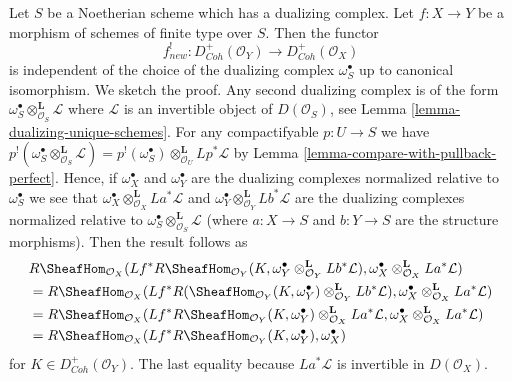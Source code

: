 \begin{remark}
\label{remark-independent-omega-S}
Let $S$ be a Noetherian scheme which has a dualizing complex.
Let $f : X \to Y$ be a morphism of schemes of finite type
over $S$. Then the functor
$$
f_{new}^! : D^+_{Coh}(\mathcal{O}_Y) \to D^+_{Coh}(\mathcal{O}_X)
$$
is independent of the choice of the dualizing complex $\omega_S^\bullet$
up to canonical isomorphism. We sketch the proof. Any second dualizing complex
is of the form $\omega_S^\bullet \otimes_{\mathcal{O}_S}^\mathbf{L} \mathcal{L}$
where $\mathcal{L}$ is an invertible object of $D(\mathcal{O}_S)$, see
Lemma \ref{lemma-dualizing-unique-schemes}.
For any compactifyable $p : U \to S$ we have
$p^!(\omega_S^\bullet \otimes^\mathbf{L}_{\mathcal{O}_S} \mathcal{L}) =
p^!(\omega_S^\bullet) \otimes^\mathbf{L}_{\mathcal{O}_U} Lp^*\mathcal{L}$
by Lemma \ref{lemma-compare-with-pullback-perfect}.
Hence, if $\omega_X^\bullet$ and $\omega_Y^\bullet$ are the
dualizing complexes normalized relative to $\omega_S^\bullet$ we see that
$\omega_X^\bullet \otimes_{\mathcal{O}_X}^\mathbf{L} La^*\mathcal{L}$ and
$\omega_Y^\bullet \otimes_{\mathcal{O}_Y}^\mathbf{L} Lb^*\mathcal{L}$
are the dualizing complexes normalized relative to
$\omega_S^\bullet \otimes_{\mathcal{O}_S}^\mathbf{L} \mathcal{L}$
(where $a : X \to S$ and $b : Y \to S$ are the structure morphisms).
Then the result follows as
\begin{align*}
& R\SheafHom_{\mathcal{O}_X}(Lf^*R\SheafHom_{\mathcal{O}_Y}(K,
\omega_Y^\bullet \otimes_{\mathcal{O}_Y}^\mathbf{L} Lb^*\mathcal{L}),
\omega_X^\bullet \otimes_{\mathcal{O}_X}^\mathbf{L} La^*\mathcal{L}) \\
& = R\SheafHom_{\mathcal{O}_X}(Lf^*R(\SheafHom_{\mathcal{O}_Y}(K,
\omega_Y^\bullet) \otimes_{\mathcal{O}_Y}^\mathbf{L} Lb^*\mathcal{L}),
\omega_X^\bullet \otimes_{\mathcal{O}_X}^\mathbf{L} La^*\mathcal{L}) \\
& = R\SheafHom_{\mathcal{O}_X}(Lf^*R\SheafHom_{\mathcal{O}_Y}(K,
\omega_Y^\bullet) \otimes_{\mathcal{O}_X}^\mathbf{L} La^*\mathcal{L},
\omega_X^\bullet \otimes_{\mathcal{O}_X}^\mathbf{L} La^*\mathcal{L}) \\
& = R\SheafHom_{\mathcal{O}_X}(Lf^*R\SheafHom_{\mathcal{O}_Y}(K,
\omega_Y^\bullet), \omega_X^\bullet)
\end{align*}
for $K \in D^+_{Coh}(\mathcal{O}_Y)$.
The last equality because $La^*\mathcal{L}$ is invertible in
$D(\mathcal{O}_X)$.
\end{remark}



